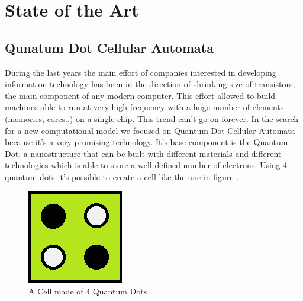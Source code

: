 \chapter{State of the Art}\label{sec:state_of_art}
\section{Qunatum Dot Cellular Automata}
During the last years the main effort of companies interested in developing information technology has been in the direction of shrinking size of transistors, the main component of any modern computer. This effort allowed to build machines able to run at very high frequency with a huge number of elements (memories, cores..) on a single chip.  This trend can't go on forever. In the search for a new computational model we focused on Quantum Dot Cellular Automata because it's a very promising technology. It's base component is the Quantum Dot, a nanostructure that can be built with different materials and different technologies which is able to store a well defined number of electrons. Using 4 quantum dots it's possible to create a cell like the one in figure \label{img:cell}. 

\begin{figure}
\centering
\includegraphics[scale=0.8]{img/_Cell1.png}
\caption{A Cell made of 4 Quantum Dots}
\label{img:cell}
\end{figure}

